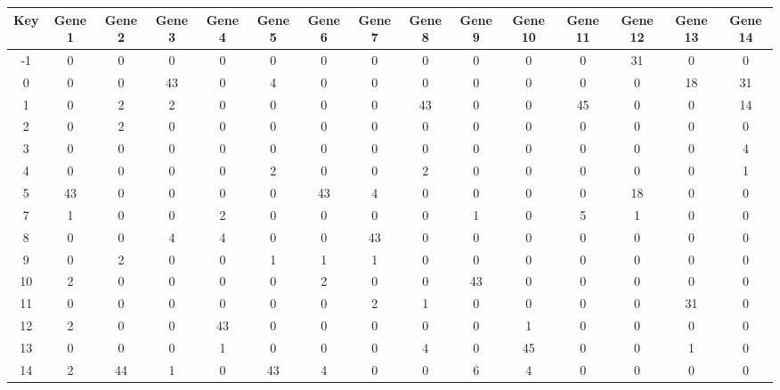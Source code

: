 \begin{tabular}{|c|c|c|c|c|c|c|c|c|c|c|c|c|c|c|}
\hline
Key & Gene 1 & Gene 2 & Gene 3 & Gene 4 & Gene 5 & Gene 6 & Gene 7 & Gene 8 & Gene 9 & Gene 10 & Gene 11 & Gene 12 & Gene 13 & Gene 14 \\
\hline
-1 & 0 & 0 & 0 & 0 & 0 & 0 & 0 & 0 & 0 & 0 & 0 & 31 & 0 & 0 \\
0 & 0 & 0 & 43 & 0 & 4 & 0 & 0 & 0 & 0 & 0 & 0 & 0 & 18 & 31 \\
1 & 0 & 2 & 2 & 0 & 0 & 0 & 0 & 43 & 0 & 0 & 45 & 0 & 0 & 14 \\
2 & 0 & 2 & 0 & 0 & 0 & 0 & 0 & 0 & 0 & 0 & 0 & 0 & 0 & 0 \\
3 & 0 & 0 & 0 & 0 & 0 & 0 & 0 & 0 & 0 & 0 & 0 & 0 & 0 & 4 \\
4 & 0 & 0 & 0 & 0 & 2 & 0 & 0 & 2 & 0 & 0 & 0 & 0 & 0 & 1 \\
5 & 43 & 0 & 0 & 0 & 0 & 43 & 4 & 0 & 0 & 0 & 0 & 18 & 0 & 0 \\
7 & 1 & 0 & 0 & 2 & 0 & 0 & 0 & 0 & 1 & 0 & 5 & 1 & 0 & 0 \\
8 & 0 & 0 & 4 & 4 & 0 & 0 & 43 & 0 & 0 & 0 & 0 & 0 & 0 & 0 \\
9 & 0 & 2 & 0 & 0 & 1 & 1 & 1 & 0 & 0 & 0 & 0 & 0 & 0 & 0 \\
10 & 2 & 0 & 0 & 0 & 0 & 2 & 0 & 0 & 43 & 0 & 0 & 0 & 0 & 0 \\
11 & 0 & 0 & 0 & 0 & 0 & 0 & 2 & 1 & 0 & 0 & 0 & 0 & 31 & 0 \\
12 & 2 & 0 & 0 & 43 & 0 & 0 & 0 & 0 & 0 & 1 & 0 & 0 & 0 & 0 \\
13 & 0 & 0 & 0 & 1 & 0 & 0 & 0 & 4 & 0 & 45 & 0 & 0 & 1 & 0 \\
14 & 2 & 44 & 1 & 0 & 43 & 4 & 0 & 0 & 6 & 4 & 0 & 0 & 0 & 0 \\
\hline
\end{tabular}